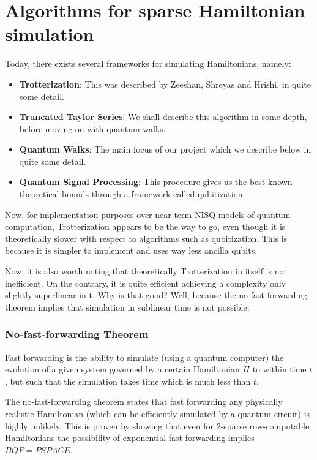 \documentclass[
10pt, %
a4paper, %
oneside, %
headinclude,footinclude, %
BCOR5mm, %
]{scrartcl}
\begin{document}
\section{Algorithms for sparse Hamiltonian simulation}
Today, there exists several frameworks for simulating Hamiltonians, namely:
\begin{itemize}
    \item \textbf{Trotterization}: This was described by Zeeshan, Shreyas and Hrishi, in quite some detail.
    \item \textbf{Truncated Taylor Series}: We shall describe this algorithm in some depth, before moving on with quantum walks.
    \item \textbf{Quantum Walks}: The main focus of our project which we describe below in quite some detail. 
    \item \textbf{Quantum Signal Processing}: This procedure gives us the best known theoretical bounds through a framework called qubitization.
\end{itemize}

Now, for implementation purposes over near term NISQ models of quantum computation, Trotterization appears to be the way to go, even though it is theoretically slower with respect to algorithms such as qubitization. This is because it is simpler to implement and uses way less ancilla qubits.\newline

Now, it is also worth noting that theoretically Trotterization in itself is not inefficient. On the contrary, it is quite efficient achieving a complexity only slightly superlinear in t. Why is that good? Well, because the no-fast-forwarding theorem implies that simulation in sublinear time is not possible.

\subsubsection{No-fast-forwarding Theorem}
Fast forwarding is the ability to simulate (using a quantum computer) the evolution of a given system governed by a certain Hamiltonian $H$ to within time $t$, but such that the simulation takes time which is much less than $t$.\newline

The no-fast-forwarding theorem states that fast forwarding any physically realistic Hamiltonian (which can be efficiently simulated by a quantum circuit) is highly unlikely. This is proven by showing that even for $2$-sparse row-computable Hamiltonians the possibility of exponential fast-forwarding implies $BQP = PSPACE$.
\end{document}
